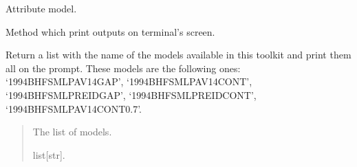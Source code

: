 \documentclass[letterpaper,10pt,english]{sphinxmanual}
\begin{document}
\begin{fulllineitems}
\begin{fulllineitems}
\end{fulllineitems}


\begin{fulllineitems}
\label{\detokenize{source/api/setup_micro_LP:nucleardatapy.setup_micro_LP.SetupMicroLP.model}}
\pysigstartsignatures
{}
\pysigstopsignatures
\sphinxAtStartPar
Attribute model.

\end{fulllineitems}


\begin{fulllineitems}
\label{\detokenize{source/api/setup_micro_LP:nucleardatapy.setup_micro_LP.SetupMicroLP.print_outputs}}
\pysigstartsignatures
{}
\pysigstopsignatures
\sphinxAtStartPar
Method which print outputs on terminal’s screen.

\end{fulllineitems}


\end{fulllineitems}


\begin{fulllineitems}
\label{\detokenize{source/api/setup_micro_LP:nucleardatapy.setup_micro_LP.models_micro_LP}}
\pysigstartsignatures
{}
\pysigstopsignatures
\sphinxAtStartPar
Return a list with the name of the models available in this toolkit and     print them all on the prompt. These models are the following ones:     ‘1994\sphinxhyphen{}BHF\sphinxhyphen{}SM\sphinxhyphen{}LP\sphinxhyphen{}AV14\sphinxhyphen{}GAP’, ‘1994\sphinxhyphen{}BHF\sphinxhyphen{}SM\sphinxhyphen{}LP\sphinxhyphen{}AV14\sphinxhyphen{}CONT’,     ‘1994\sphinxhyphen{}BHF\sphinxhyphen{}SM\sphinxhyphen{}LP\sphinxhyphen{}REID\sphinxhyphen{}GAP’, ‘1994\sphinxhyphen{}BHF\sphinxhyphen{}SM\sphinxhyphen{}LP\sphinxhyphen{}REID\sphinxhyphen{}CONT’, ‘1994\sphinxhyphen{}BHF\sphinxhyphen{}SM\sphinxhyphen{}LP\sphinxhyphen{}AV14\sphinxhyphen{}CONT\sphinxhyphen{}0.7’.
\begin{quote}\begin{description}
\sphinxAtStartPar
The list of models.

\sphinxAtStartPar
list{[}str{]}.

\end{description}\end{quote}

\end{fulllineitems}
\end{document}
